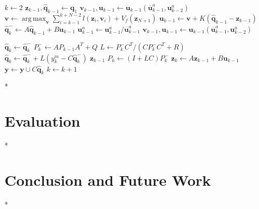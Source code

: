 \documentclass[letterpaper,10pt,conference]{ieeeconf}
\DeclarePairedDelimiter\abs{\lvert}{\rvert}%
\theoremstyle{definition}
\DeclareMathOperator*{\argmax}{arg\,max}
\begin{document}
\begin{algorithmic}[1]
  \State $k\gets 2$
  \State $\mathbf{z}_{k-1},\hat{\mathbf{q}}_{k-1}\gets \mathbf{q}_1$
  \State $\mathbf{v}_{k-1},\mathbf{u}_{k-1}\gets {\mathbf{u}_{k-1}(\overline{\mathbf{u}}_{k-1}^a,\mathbf{u}_{k-2}^a)}$
    \Do
      \State $\mathbf{v}\gets\argmax_{\mathbf{v}}{\sum_{i=k-1}^{k+N-2}}{l(\mathbf{z}_i,\mathbf{v}_i)+V_f(\mathbf{z}_{N+1})}$
      \State $\mathbf{u}_{k-1}\gets \mathbf{v}+K(\hat{\mathbf{q}}_{k-1}-\mathbf{z}_{k-1})$
      \State $\hat{\mathbf{q}}_k^-\gets A\hat{\mathbf{q}}_{k-1} + B\mathbf{u}_{k-1}$
        \State $\mathbf{u}^a_{k-1}\gets\mathbf{u}^a_{k-1}/\overline{\mathbf{u}}^a_{k-1}$
        \State $\mathbf{v}_{k-1},\mathbf{u}_{k-1}\gets {\mathbf{u}_{k-1}(\overline{\mathbf{u}}_{k-1}^a,\mathbf{u}_{k-2}^a)}$

      \EndIf

      \State $\hat{\mathbf{q}}_k\gets\hat{\mathbf{q}}_k^-$
    \Else 
      \State $P_k^-\gets AP_{k-1}A^T+Q$
      \State $L\gets P_k^-C^T/(CP_k^-C^T+R)$
      \State $\hat{\mathbf{q}}_k\gets \hat{\mathbf{q}}_k^-+L(y_k^m-C\hat{\mathbf{q}}_k^-)$
      $\mathbf{z}_{k-1}$
      \State $P_k\gets(I+LC)P_k^-$
    \EndIf
    \State $\mathbf{z}_k\gets A\mathbf{z}_{k-1}+B\mathbf{u}_{k-1}$
    \State $\mathbf{y}\gets\mathbf{y}\cup C\hat{\mathbf{q}}_k$
    \State $k\gets k + 1$
  \EndWhile %
  \EndProcedure
\end{algorithmic}
  
*

\section{Evaluation}
\label{sec:experimental}

*

\section{Conclusion and Future Work}
\label{sec:conclusion}

*


 
\vspace{0.1ex}

\newpage
\end{document}
